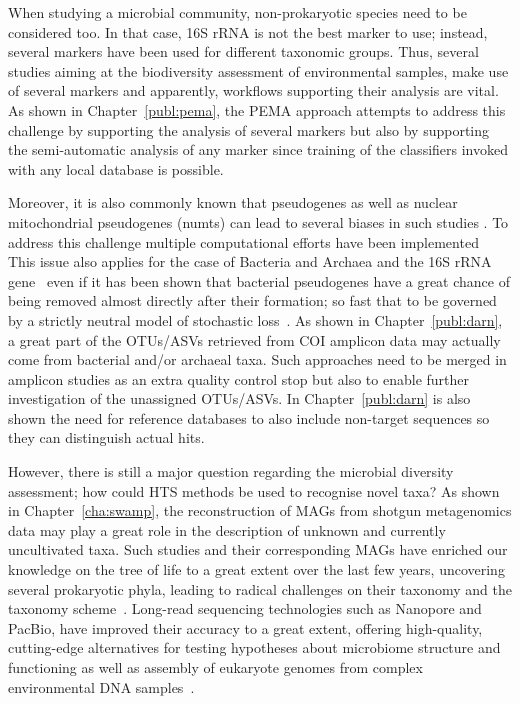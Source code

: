    When studying a microbial community, non-prokaryotic species need to be considered too. 
   In that case, 16S rRNA is not the best marker to use; instead, several markers 
   have been used for different taxonomic groups. 
   Thus, several studies aiming at the biodiversity assessment of environmental samples, 
   make use of several markers and apparently, workflows supporting their analysis are vital. 
   As shown in Chapter~\ref{publ:pema}, the PEMA approach attempts to address this challenge 
   by supporting the analysis of several markers but also by
   supporting the semi-automatic analysis of any marker since training of the classifiers invoked
   with any local database is possible. 

   Moreover, it is also commonly known that pseudogenes as well as 
   nuclear mitochondrial pseudogenes (numts) can lead to several biases in such studies \citep{song2008many}.
   To address this challenge multiple computational efforts have been implemented~\citep{porter2021profile}
   This issue also applies for the case of Bacteria and Archaea and the 16S rRNA gene~\citep{pei2010diversity}
   even if it has been shown that bacterial pseudogenes have a great chance of being removed almost directly after their formation;
   so fast that to be governed by a strictly neutral model of stochastic loss~\citep{kuo2010extinction}.
   As shown in Chapter~\ref{publ:darn}, a great part of the OTUs/ASVs retrieved from COI amplicon data
   may actually come from bacterial and/or archaeal taxa.
   Such approaches need to be merged in amplicon studies as an extra
   quality control stop but also to enable further investigation of the unassigned OTUs/ASVs. 
   In Chapter~\ref{publ:darn} is also shown the need for reference databases to also include non-target sequences 
   so they can distinguish actual hits. 

   However, there is still a major question regarding the microbial diversity assessment; 
   how could HTS methods be used to recognise novel taxa? 
   As shown in Chapter~\ref{cha:swamp}, the reconstruction of MAGs from shotgun metagenomics data
   may play a great role in the description of unknown and currently uncultivated taxa. 
   Such studies and their corresponding MAGs have enriched our knowledge on the tree of life to a great extent 
   over the last few years, uncovering several prokaryotic phyla, leading to 
   radical challenges on their taxonomy and the taxonomy scheme~\citep{parks_gtdb_2022}.
   Long-read sequencing technologies such as Nanopore and PacBio, have improved their accuracy to a great extent,
   offering high-quality, cutting-edge alternatives for testing hypotheses about microbiome structure 
   and functioning as well as assembly of eukaryote genomes from complex environmental DNA samples~\citep{tedersoo2021perspectives}.

